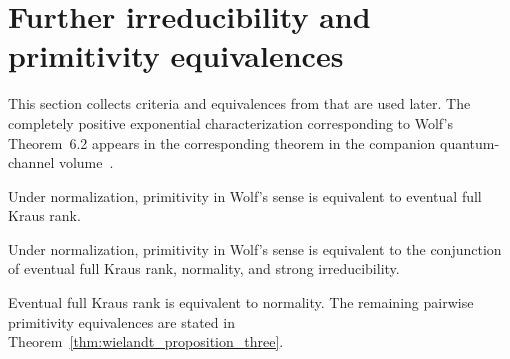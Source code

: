 \section{Further irreducibility and primitivity equivalences}

This section collects criteria and equivalences from
\cite[Theorems~6.7 and~6.8]{Wolf2012Quantum} that are used later. The
completely positive exponential characterization corresponding to Wolf's
Theorem~6.2 appears in the corresponding theorem in the companion quantum-channel volume~\cite[``Exponential characterization of irreducibility'']{QICLean2026Blueprint}.


\begin{theorem}%
    \label{thm:wolf_6_8_kraus_span}
    \leanok
    Under normalization, primitivity in Wolf's sense is equivalent to eventual
    full Kraus rank.
\end{theorem}

\begin{theorem}%
    \label{thm:wolf_6_8_conjunction}
    \leanok
    Under normalization, primitivity in Wolf's sense is equivalent to the conjunction
    of eventual full Kraus rank, normality, and strong irreducibility.
\end{theorem}

\begin{remark}
    \label{rem:wolf_6_8_pairwise}
    \leanok
    Eventual full Kraus rank is equivalent to normality. The remaining
    pairwise primitivity equivalences are stated in
    Theorem~\ref{thm:wielandt_proposition_three}.
\end{remark}
